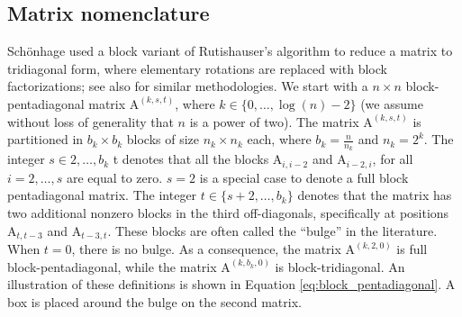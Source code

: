 \documentclass{article}
\newcommand\matA{\boldsymbol{\mathrm{A}}}
\begin{document}
\subsection{Matrix nomenclature}
Schönhage \cite{schonhage1972unitare} used a block variant of Rutishauser's algorithm \cite{rutishauser1963jacobi} to reduce a matrix to tridiagonal form, where elementary rotations are replaced with block factorizations; 
see also \cite{bischof2000framework,ballard2012communication,ballard2015avoiding} for similar methodologies. 
We start with a $n\times n$ block-pentadiagonal matrix $\matA^{(k,s,t)}$, where $k\in \big\{0,\ldots,\log(n)-2\big\}$ (we assume without loss of generality that $n$ is a power of two). 
The matrix $\matA^{(k,s,t)}$ is partitioned in $b_k\times b_k$ blocks of size $n_k\times n_k$ each, where $b_k=\tfrac{n}{n_k}$ and $n_k=2^{k}$. 
The integer $s\in 2,\ldots,b_k$ t denotes that all the blocks $\matA_{i,i-2}$ and $\matA_{i-2,i}$, for all $i=2,\ldots,s$ are equal to zero. $s=2$ is a special case to denote a full block pentadiagonal matrix. 
The integer $t\in \big\{s+2,\ldots, b_k\big\}$  denotes that the matrix has two additional nonzero blocks in the third off-diagonals, specifically at positions $\matA_{t,t-3}$ and $\matA_{t-3,t}$. 
These blocks are often called the ``bulge'' in the literature.
When $t=0$, there is no bulge. As a consequence, the matrix $\matA^{(k,2,0)}$ is full block-pentadiagonal, while the matrix $\matA^{(k,b_k,0)}$ is block-tridiagonal. An illustration of these definitions is shown in Equation \eqref{eq:block_pentadiagonal}. A box is placed around the bulge on the second matrix.
\begingroup
\small
\setlength\arraycolsep{0.8pt}
\end{document}
